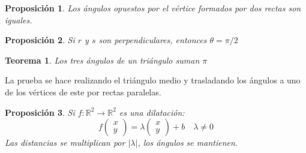 \documentclass[11pt, a4paper, titlepage]{article}
\makeatletter
\renewenvironment{proof}[1][\proofname] {\vspace{-15pt}\par\pushQED{\qed}\normalfont\topsep6\p@\@plus6\p@\relax\trivlist\item[\hskip\labelsep\it#1\@addpunct{.}]\ignorespaces}{\popQED\endtrivlist\@endpefalse}
\newcommand{\R}{\mathbb{R}}
\theoremstyle{theorem-style}
\newtheorem*{nth}{Teorema}
\newtheorem*{nprop}{Proposición}
\theoremstyle{definition-style}
\theoremstyle{remark-style}
\theoremstyle{example-style}
\makeatother
\begin{document}
\begin{nprop}
	Los ángulos opuestos por el vértice formados por dos rectas son iguales.
\end{nprop}

\begin{nprop}
	Si $r$ y $s$ son perpendiculares, entonces $\theta = \pi/2$
\end{nprop}

\begin{nth}
	Los tres ángulos de un triángulo suman $\pi$
\end{nth}
\begin{proof}
	La prueba se hace realizando el triángulo medio y trasladando los ángulos a uno de los vértices de este por rectas paralelas.
\end{proof}

\begin{nprop}
	Si $f:\R^2 \to \R^2$ es una dilatación:
	\[
	f \begin{pmatrix}
 x\\
 y 
\end{pmatrix} = \lambda\begin{pmatrix}
 x\\
 y 
\end{pmatrix} + b \quad \lambda \ne 0
	\]
	Las distancias se multiplican por $|\lambda|$, los ángulos se mantienen.
\end{nprop}
\end{document}
